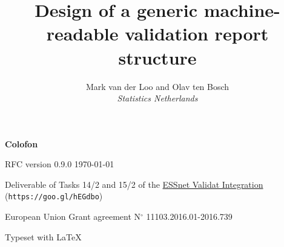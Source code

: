 \documentclass[a4paper, 11pt,titlepage]{article}
\title{Design of a generic machine-readable validation report structure}
\author{Mark van der Loo and Olav ten Bosch\\
\emph{Statistics Netherlands}
}
\date{\version{}\\
\begin{picture}(0,0)
\put(150,350){\texttt{[image: fig/logo\_validat\_integration.png]}}
\end{picture}
}
\newcommand{\version}{RFC version 0.9.0 \today}
\begin{document}
\maketitle{}

\thispagestyle{empty}
\null
\vfill{}
\begin{description}[noitemsep]
\item \textbf{Colofon}
\item \version{}
\item Deliverable of Tasks 14/2 and 15/2 of the \href{https://ec.europa.eu/eurostat/cros/content/essnet-validat-integration_en}{ESSnet Validat Integration} (\texttt{https://goo.gl/hEGdbo})
\item European Union Grant agreement N$^\circ$ 11103.2016.01-2016.739
\item Typeset with \LaTeX
\end{description}

\newpage

\tableofcontents{}

\newpage














\clearpage{}


\clearpage{}




\clearpage{}

\end{document}
